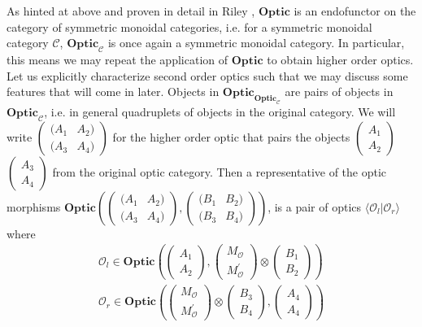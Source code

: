 \documentclass[letterpaper, 10 pt, conference]{ieeeconf}  %
\newcommand{\Optic}{\textbf{Optic}}
\begin{document}
As hinted at above and proven in detail in Riley \cite{riley:optics}, $\Optic$
is an endofunctor on the category of symmetric monoidal categories, i.e. for
a symmetric monoidal category $\mathcal{C}$, $\Optic_{\mathcal{C}}$ is once again
a symmetric monoidal category. In particular, this means we may repeat the
application of $\Optic$ to obtain higher order optics. Let us explicitly
characterize second order optics such that we may discuss some features that
will come in later. Objects in $\Optic_{\Optic_{\mathcal{C}}}$ are pairs of
objects in $\Optic_{\mathcal{C}}$, i.e. in general quadruplets of objects in
the original category. We will write $\left(\begin{array}{cc} (A_1 & A_2) \\ (A_3 & A_4) \end{array}\right)$
for the higher order optic that pairs the objects $\left(\begin{array}{cc} A_1 \\ A_2\end{array}\right)$
$\left(\begin{array}{cc} A_3 \\ A_4\end{array}\right)$ from the original optic category.
Then a representative of the optic morphisms
$\Optic\left(\left(\begin{array}{cc} (A_1 & A_2) \\ (A_3 & A_4) \end{array}\right),
\left(\begin{array}{cc} (B_1 & B_2) \\ (B_3 & B_4) \end{array}\right)\right)$,
is a pair of optics $\langle \mathcal{O}_l | \mathcal{O}_r \rangle$ where
\begin{equation}
\begin{split}
\mathcal{O}_l \in \Optic\left(\left( \begin{array}{c} A_1 \\ A_2 \end{array} \right),
\left( \begin{array}{c} M_\mathcal{O} \\ M_\mathcal{O}^\prime \end{array} \right) \otimes
\left( \begin{array}{c} B_1 \\ B_2 \end{array} \right)
\right)
\\
\mathcal{O}_r \in \Optic\left(
\left( \begin{array}{c} M_\mathcal{O} \\ M_\mathcal{O}^\prime \end{array} \right) \otimes
\left( \begin{array}{c} B_3 \\ B_4 \end{array} \right),
\left( \begin{array}{c} A_4 \\ A_4 \end{array} \right)
\right)
\end{split}
\end{equation}
\end{document}
